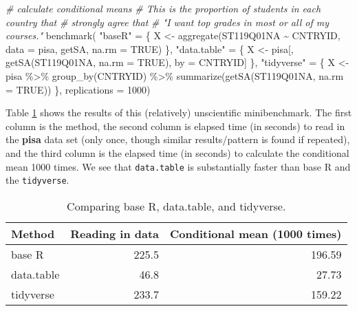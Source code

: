 \documentclass[
]{book}
\newenvironment{Shaded}{\begin{snugshade}}{\end{snugshade}}
\newcommand{\AttributeTok}[1]{\textcolor[rgb]{0.77,0.63,0.00}{#1}}
\newcommand{\CommentTok}[1]{\textcolor[rgb]{0.56,0.35,0.01}{\textit{#1}}}
\newcommand{\ConstantTok}[1]{\textcolor[rgb]{0.00,0.00,0.00}{#1}}
\newcommand{\DecValTok}[1]{\textcolor[rgb]{0.00,0.00,0.81}{#1}}
\newcommand{\FunctionTok}[1]{\textcolor[rgb]{0.00,0.00,0.00}{#1}}
\newcommand{\NormalTok}[1]{#1}
\newcommand{\OtherTok}[1]{\textcolor[rgb]{0.56,0.35,0.01}{#1}}
\newcommand{\SpecialCharTok}[1]{\textcolor[rgb]{0.00,0.00,0.00}{#1}}
\newcommand{\StringTok}[1]{\textcolor[rgb]{0.31,0.60,0.02}{#1}}
\begin{document}
\begin{Shaded}
\begin{Highlighting}[]
\CommentTok{\# calculate conditional means}
\CommentTok{\# This is the proportion of students in each country that }
\CommentTok{\# strongly agree that }
\CommentTok{\# "I want top grades in most or all of my courses."}
\FunctionTok{benchmark}\NormalTok{(}
  \StringTok{"baseR"} \OtherTok{=}\NormalTok{ \{}
\NormalTok{    X }\OtherTok{\textless{}{-}} \FunctionTok{aggregate}\NormalTok{(ST119Q01NA }\SpecialCharTok{\textasciitilde{}}\NormalTok{ CNTRYID, }\AttributeTok{data =}\NormalTok{ pisa, getSA, }\AttributeTok{na.rm =} \ConstantTok{TRUE}\NormalTok{)}
\NormalTok{  \},}
  \StringTok{"data.table"} \OtherTok{=}\NormalTok{ \{}
\NormalTok{    X }\OtherTok{\textless{}{-}}\NormalTok{ pisa[, }
              \FunctionTok{getSA}\NormalTok{(ST119Q01NA, }\AttributeTok{na.rm =} \ConstantTok{TRUE}\NormalTok{), }
\NormalTok{              by }\OtherTok{=}\NormalTok{ CNTRYID]}
\NormalTok{  \},}
  \StringTok{"tidyverse"} \OtherTok{=}\NormalTok{ \{}
\NormalTok{    X }\OtherTok{\textless{}{-}}\NormalTok{ pisa }\SpecialCharTok{\%\textgreater{}\%} 
      \FunctionTok{group\_by}\NormalTok{(CNTRYID) }\SpecialCharTok{\%\textgreater{}\%} 
      \FunctionTok{summarize}\NormalTok{(}\FunctionTok{getSA}\NormalTok{(ST119Q01NA, }\AttributeTok{na.rm =} \ConstantTok{TRUE}\NormalTok{))}
\NormalTok{  \},}
  \AttributeTok{replications =} \DecValTok{1000}\NormalTok{)}
\end{Highlighting}
\end{Shaded}

Table \ref{tab:benchresults} shows the results of this (relatively) unscientific minibenchmark. The first column is the method, the second column is elapsed time (in seconds) to read in the \textbf{pisa} data set (only once, though similar results/pattern is found if repeated), and the third column is the elapsed time (in seconds) to calculate the conditional mean 1000 times. We see that \texttt{data.table} is substantially faster than base R and the \texttt{tidyverse}.

\begin{table}

\caption{\label{tab:benchresults}Comparing base R, data.table, and tidyverse.}
\centering
\begin{tabular}[t]{l|r|r}
\hline
Method & Reading in data & Conditional mean (1000 times)\\
\hline
base R & 225.5 & 196.59\\
\hline
data.table & 46.8 & 27.73\\
\hline
tidyverse & 233.7 & 159.22\\
\hline
\end{tabular}
\end{table}
\end{document}
